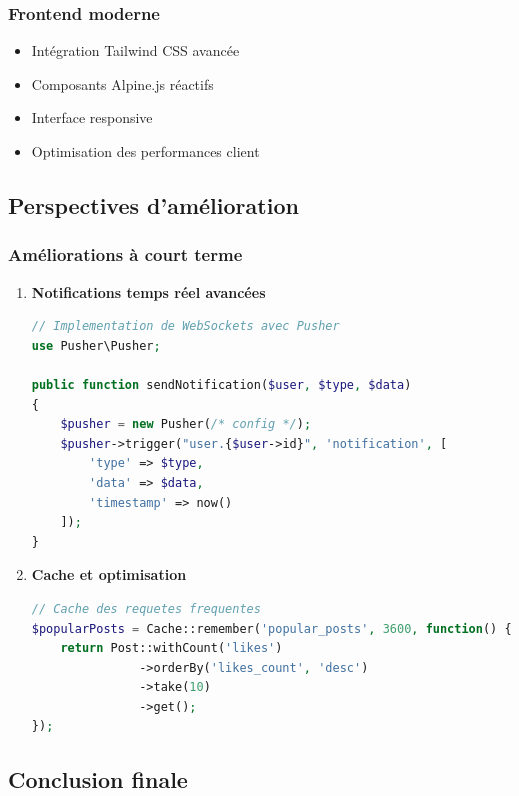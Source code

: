 \documentclass[12pt,a4paper]{article}
\begin{document}
\subsubsection{Frontend moderne}
\begin{itemize}
    \item Int\'egration Tailwind CSS avanc\'ee
    \item Composants Alpine.js r\'eactifs
    \item Interface responsive
    \item Optimisation des performances client
\end{itemize}

\subsection{Perspectives d'am\'elioration}

\subsubsection{Am\'eliorations \`a court terme}

\begin{enumerate}
    \item \textbf{Notifications temps r\'eel avanc\'ees}
    \begin{lstlisting}[language=PHP]
// Implementation de WebSockets avec Pusher
use Pusher\Pusher;

public function sendNotification($user, $type, $data)
{
    $pusher = new Pusher(/* config */);
    $pusher->trigger("user.{$user->id}", 'notification', [
        'type' => $type,
        'data' => $data,
        'timestamp' => now()
    ]);
}
    \end{lstlisting}

    \item \textbf{Cache et optimisation}
    \begin{lstlisting}[language=PHP]
// Cache des requetes frequentes
$popularPosts = Cache::remember('popular_posts', 3600, function() {
    return Post::withCount('likes')
               ->orderBy('likes_count', 'desc')
               ->take(10)
               ->get();
});
    \end{lstlisting}
\end{enumerate}

\subsection{Conclusion finale}
\end{document}
